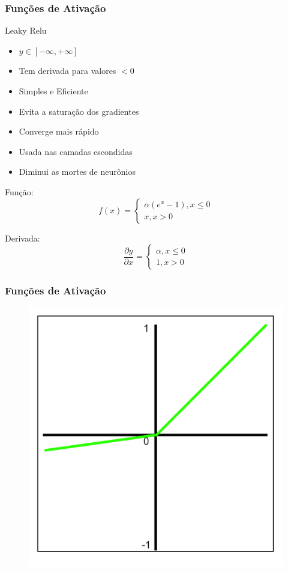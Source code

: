 \documentclass{beamer}
\begin{document}
\begin{frame}
	\frametitle{Funções de Ativação}
	\begin{block}{Leaky Relu}
		\begin{itemize}
			\item $y \in [- \infty, + \infty]$
			\item Tem derivada para valores $<0$
			\item Simples e Eficiente
			\item Evita a saturação dos gradientes
			\item Converge mais rápido
			\item Usada nas camadas escondidas
			\item Diminui as mortes de neurônios
		\end{itemize}
		Função:
		$$f(x) = 		\left\{\begin{matrix}
			\alpha(e^x - 1), x \leq 0
			\\ 
			x, x > 0
		\end{matrix}\right.$$
	
		Derivada: 	$$\frac{\partial y}{\partial x} =
		\left\{\begin{matrix}
			\alpha, x \leq 0
			\\ 
			1, x > 0
		\end{matrix}\right.$$
	\end{block}
\end{frame}
\begin{frame}
	\frametitle{Funções de Ativação}
	\begin{figure}
		\centering
		\includegraphics[width=0.4\linewidth]{figures/leaky_relu_function}
	\end{figure}
	
\end{frame}
\end{document}
